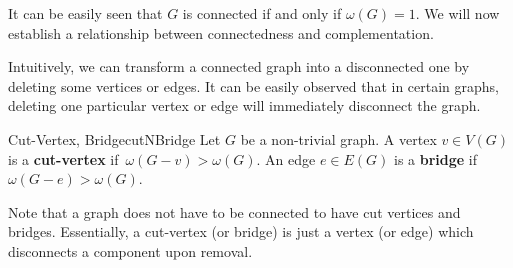 \documentclass[math]{amznotes}
\makeatletter
\let\save@mathaccent\mathaccent
\newcommand*\if@single[3]{%
  \setbox0\hbox{${\mathaccent"0362{#1}}^H$}%
  \setbox2\hbox{${\mathaccent"0362{\kern0pt#1}}^H$}%
  \ifdim\ht0=\ht2 #3\else #2\fi
  }
\newcommand*\rel@kern[1]{\kern#1\dimexpr\macc@kerna}
\newcommand*\widebar[1]{\@ifnextchar^{{\wide@bar{#1}{0}}}{\wide@bar{#1}{1}}}
\newcommand*\wide@bar[2]{\if@single{#1}{\wide@bar@{#1}{#2}{1}}{\wide@bar@{#1}{#2}{2}}}
\newcommand*\wide@bar@[3]{%
  \begingroup
  \def\mathaccent##1##2{%
    \let\mathaccent\save@mathaccent
    \if#32 \let\macc@nucleus\first@char \fi
    \setbox\z@\hbox{$\macc@style{\macc@nucleus}_{}$}%
    \setbox\tw@\hbox{$\macc@style{\macc@nucleus}{}_{}$}%
    \dimen@\wd\tw@
    \advance\dimen@-\wd\z@
    \divide\dimen@ 3
    \@tempdima\wd\tw@
    \advance\@tempdima-\scriptspace
    \divide\@tempdima 10
    \advance\dimen@-\@tempdima
    \ifdim\dimen@>\z@ \dimen@0pt\fi
    \rel@kern{0.6}\kern-\dimen@
    \if#31
      \overline{\rel@kern{-0.6}\kern\dimen@\macc@nucleus\rel@kern{0.4}\kern\dimen@}%
      \advance\dimen@0.4\dimexpr\macc@kerna
      \let\final@kern#2%
      \ifdim\dimen@<\z@ \let\final@kern1\fi
      \if\final@kern1 \kern-\dimen@\fi
    \else
      \overline{\rel@kern{-0.6}\kern\dimen@#1}%
    \fi
  }%
  \macc@depth\@ne
  \let\math@bgroup\@empty \let\math@egroup\macc@set@skewchar
  \mathsurround\z@ \frozen@everymath{\mathgroup\macc@group\relax}%
  \macc@set@skewchar\relax
  \let\mathaccentV\macc@nested@a
  \if#31
    \macc@nested@a\relax111{#1}%
  \else
    \def\gobble@till@marker##1\endmarker{}%
    \futurelet\first@char\gobble@till@marker#1\endmarker
    \ifcat\noexpand\first@char A\else
      \def\first@char{}%
    \fi
    \macc@nested@a\relax111{\first@char}%
  \fi
  \endgroup
}
\theoremstyle{remark}
\newcommand{\0}{\mathbf{0}}
\newcommand{\1}{\mathbf{1}}
\makeatother
\begin{document}
It can be easily seen that $G$ is connected if and only if $\omega(G) = 1$. We will now establish a relationship between connectedness and complementation.
Intuitively, we can transform a connected graph into a disconnected one by deleting some vertices or edges. It can be easily observed that in certain graphs, deleting one particular vertex or edge will immediately disconnect the graph.
\begin{dfnbox}{Cut-Vertex, Bridge}{cutNBridge}
    Let $G$ be a non-trivial graph. A vertex $v \in V(G)$ is a {\color{red} \textbf{cut-vertex}} if~$\omega(G - v) > \omega(G)$. An edge $e \in E(G)$ is a {\color{red} \textbf{bridge}} if $\omega(G - e) > \omega(G)$.
\end{dfnbox}
Note that a graph does not have to be connected to have cut vertices and bridges. Essentially, a cut-vertex (or bridge) is just a vertex (or edge) which disconnects a component upon removal.
\end{document}
